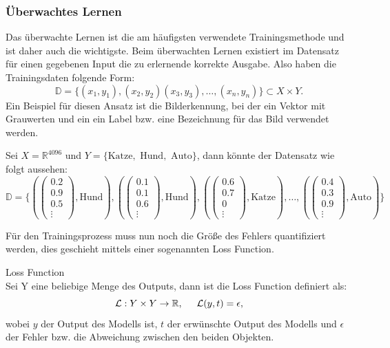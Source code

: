 \documentclass[12pt,letterpaper,ngerman]{article}
\begin{document}
\subsubsection{Überwachtes Lernen}
Das überwachte Lernen ist die am häufigsten verwendete Trainingsmethode
und ist daher auch die wichtigste. Beim überwachten Lernen existiert 
im Datensatz für einen gegebenen Input die zu erlernende
korrekte Ausgabe. Also haben die Trainingsdaten folgende Form:
  \[\mathbb{D} = \{ (x_1,y_1), (x_2,y_2) (x_3,y_3), \dots ,(x_n,y_n)\} 
  \subset X \times Y.\]
Ein Beispiel für diesen Ansatz ist die Bilderkennung, bei der ein Vektor
mit Grauwerten und ein ein Label bzw. eine Bezeichnung für das Bild
verwendet werden.
\begin{example}
  Sei $X = \mathbb{R}^{4096}$ und
   $Y = \{ \text{Katze}, \text{ Hund}, \text{ Auto}\}$, dann könnte der 
   Datensatz wie folgt aussehen:
   \[
     \mathbb{D} = \{
     (\begin{pmatrix} 0.2 \\ 0.9 \\ 0.5 \\ \vdots \end{pmatrix}, \text{Hund}),
     (\begin{pmatrix} 0.1 \\ 0.1 \\ 0.6 \\ \vdots \end{pmatrix}, \text{Hund}),
     (\begin{pmatrix} 0.6 \\ 0.7 \\ 0 \\ \vdots \end{pmatrix}, \text{Katze}),
     \dots, 
     (\begin{pmatrix} 0.4 \\ 0.3 \\ 0.9 \\ \vdots \end{pmatrix}, \text{Auto})
    \}
   \]
\end{example}
Für den Trainingsprozess muss nun noch die Größe des Fehlers 
quantifiziert werden, dies geschieht mittels einer sogenannten
Loss Function.
\begin{definition}{Loss Function}
  \\
  Sei Y eine beliebige Menge des Outputs, dann
  ist die Loss Function definiert als:
  \[ \mathcal{L}: Y \times Y \to \mathbb{R}, 
  \hspace{0.5cm} \mathcal{L}(y,t) = \epsilon, \]
  wobei $y$ der Output des Modells ist, $t$ der erwünschte Output
  des Modells und $\epsilon$ der Fehler bzw. die Abweichung zwischen 
  den beiden Objekten.
\end{definition}
\end{document}
